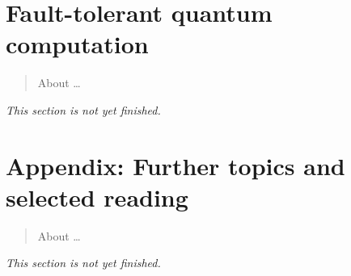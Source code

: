 \documentclass[fleqn,a4paper]{article}
\newenvironment{todo}{\color{primary}\emph{This section is not yet finished.}}{}
\let\oldsection\section
\renewcommand\section{\clearpage\oldsection}
\theoremstyle{definition}
\theoremstyle{definition}
\theoremstyle{definition}
\theoremstyle{definition}
\theoremstyle{remark}
\begin{document}
\hypertarget{fault-tolerant-quantum-computation}{%
\section{Fault-tolerant quantum computation}\label{fault-tolerant-quantum-computation}}

\begin{quote}
About \ldots{}
\end{quote}

\begin{todo}

\end{todo}

\hypertarget{further-reading}{%
\section*{\texorpdfstring{\textbf{Appendix:} Further topics and selected reading}{Appendix: Further topics and selected reading}}\label{further-reading}}

\begin{quote}
About \ldots{}
\end{quote}

\begin{todo}

\end{todo}
\end{document}
